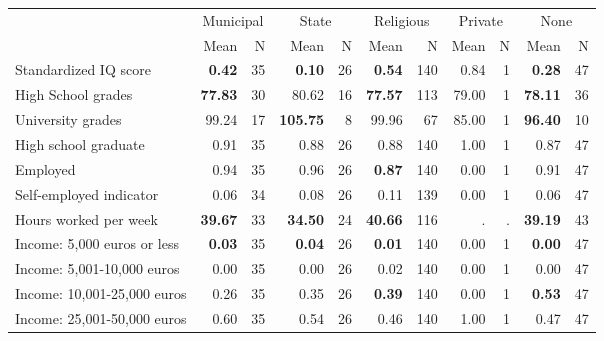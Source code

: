 \begin{tabular}{l r r r r r r r r r r}
\toprule
& \multicolumn{2}{c}{Municipal} & \multicolumn{2}{c}{State} & \multicolumn{2}{c}{Religious} & \multicolumn{2}{c}{Private} & \multicolumn{2}{c}{None} \\
& \scriptsize Mean & \scriptsize N & \scriptsize Mean & \scriptsize N & \scriptsize Mean & \scriptsize N & \scriptsize Mean & \scriptsize N & \scriptsize Mean & \scriptsize N \\
\midrule
Standardized IQ score & \textbf{     0.42} &        35 & \textbf{     0.10} &        26 & \textbf{     0.54} &       140 &      0.84 &         1 & \textbf{     0.28} &        47 \\
High School grades & \textbf{    77.83} &        30 &     80.62 &        16 & \textbf{    77.57} &       113 &     79.00 &         1 & \textbf{    78.11} &        36 \\
University grades &     99.24 &        17 & \textbf{   105.75} &         8 &     99.96 &        67 &     85.00 &         1 & \textbf{    96.40} &        10 \\
High school graduate &      0.91 &        35 &      0.88 &        26 &      0.88 &       140 &      1.00 &         1 &      0.87 &        47 \\
Employed &      0.94 &        35 &      0.96 &        26 & \textbf{     0.87} &       140 &      0.00 &         1 &      0.91 &        47 \\
Self-employed indicator &      0.06 &        34 &      0.08 &        26 &      0.11 &       139 &      0.00 &         1 &      0.06 &        47 \\
Hours worked per week & \textbf{    39.67} &        33 & \textbf{    34.50} &        24 & \textbf{    40.66} &       116 &         . & . & \textbf{    39.19} &        43 \\
Income: 5,000 euros or less & \textbf{     0.03} &        35 & \textbf{     0.04} &        26 & \textbf{     0.01} &       140 &      0.00 &         1 & \textbf{     0.00} &        47 \\
Income: 5,001-10,000 euros &      0.00 &        35 &      0.00 &        26 &      0.02 &       140 &      0.00 &         1 &      0.00 &        47 \\
Income: 10,001-25,000 euros &      0.26 &        35 &      0.35 &        26 & \textbf{     0.39} &       140 &      0.00 &         1 & \textbf{     0.53} &        47 \\
Income: 25,001-50,000 euros &      0.60 &        35 &      0.54 &        26 &      0.46 &       140 &      1.00 &         1 &      0.47 &        47 \\

\end{tabular}
